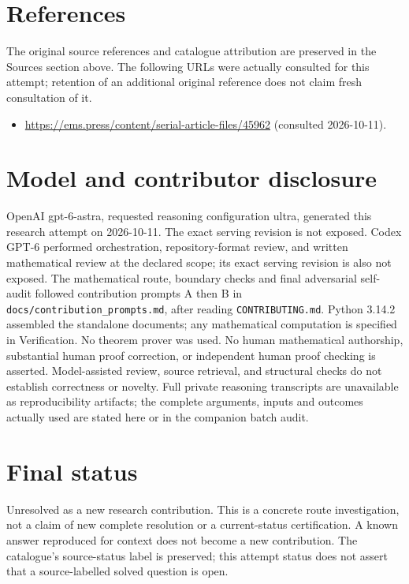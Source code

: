 \documentclass[11pt]{article}
\begin{document}
\section{References}
The original source references and catalogue attribution are preserved in the
Sources section above. The following URLs were actually consulted for this attempt;
retention of an additional original reference does not claim fresh consultation of it.
\begin{itemize}
\item \url{https://ems.press/content/serial-article-files/45962} (consulted 2026-10-11). 
\end{itemize}
\section{Model and contributor disclosure}
OpenAI gpt-6-astra, requested reasoning configuration ultra, generated this research
attempt on 2026-10-11. The exact serving revision is not exposed. Codex GPT-6
performed orchestration, repository-format review, and written mathematical review at the declared scope; its exact serving revision
is also not exposed. The mathematical route, boundary checks and final adversarial
self-audit followed contribution prompts A then B in
\texttt{docs/contribution\_prompts.md}, after reading \texttt{CONTRIBUTING.md}.
Python 3.14.2 assembled the standalone documents; any mathematical computation is
specified in Verification. No theorem prover was used. No human mathematical
authorship, substantial human proof correction, or independent human proof checking
is asserted. Model-assisted review, source retrieval, and structural checks do not
establish correctness or novelty. Full private reasoning transcripts are unavailable
as reproducibility artifacts; the complete arguments, inputs and outcomes actually
used are stated here or in the companion batch audit.
\section{Final status}
Unresolved as a new research contribution. This is a concrete route investigation,
not a claim of new complete resolution or a current-status certification. A known
answer reproduced for context does not become a new contribution. The catalogue's
source-status label is preserved; this attempt status does not assert that a
source-labelled solved question is open.
\end{document}
